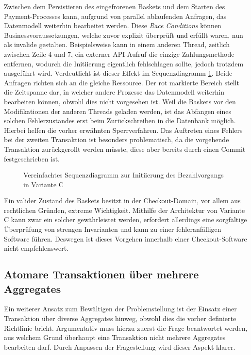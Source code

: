 Zwischen dem Persistieren des eingefrorenen Baskets und dem Starten des Payment-Processes kann, aufgrund von parallel ablaufenden Anfragen, das Datenmodell weiterhin bearbeitet werden. Diese \emph{\Gls{Race Condition}s} können Businessvoraussetzungen, welche zuvor explizit überprüft und erfüllt waren, nun als invalide gestalten. Beispielsweise kann in einem anderen Thread, zeitlich zwischen Zeile 4 und 7, ein externer API-Aufruf die einzige Zahlungsmethode entfernen, wodurch die Initiierung eigentlich fehlschlagen sollte, jedoch trotzdem ausgeführt wird. Verdeutlicht ist dieser Effekt im Sequenzdiagramm \ref{fig:VarC-Sequence-Alt}. Beide Anfragen richten sich an die gleiche Ressource. Der rot markierte Bereich stellt die Zeitspanne dar, in welcher andere Prozesse das Datenmodell weiterhin bearbeiten können, obwohl dies nicht vorgesehen ist. Weil die Baskets vor den Modifikationen der anderen Threads geladen werden, ist das Abfangen eines solchen Fehlerzustandes erst beim Zurückschreiben in die Datenbank möglich. Hierbei helfen die vorher erwähnten Sperrverfahren. Das Auftreten eines Fehlers bei der zweiten Transaktion ist besonders problematisch, da die vorgehende Transaktion zurückgerollt werden müsste, diese aber bereits durch einen Commit festgeschrieben ist. 

\begin{figure}[H]
	\vspace{0.5cm}
	\centering
	
	\caption{Vereinfachtes Sequenzdiagramm zur Initiierung des Bezahlvorgangs in Variante C}
	\label{fig:VarC-Sequence-Alt}
\end{figure}

Ein valider Zustand des Baskets besitzt in der Checkout-Domain, vor allem aus rechtlichen Gründen, extreme Wichtigkeit. Mithilfe der Architektur von Variante C kann zwar ein solcher gewährleistet werden, erfordert allerdings eine sorgfältige Überprüfung von strengen Invarianten und kann zu einer fehleranfälligen Software führen. Deswegen ist dieses Vorgehen innerhalb einer Checkout-Software nicht empfehlenswert. 


\subsection{Atomare Transaktionen über mehrere Aggregates}

Ein weiterer Ansatz zum Bewältigen der Problemstellung ist der Einsatz einer Transaktion über diverse Aggregates hinweg, obwohl dies die vorher definierte Richtlinie bricht. Argumentativ muss hierzu zuerst die Frage beantwortet werden, aus welchem Grund überhaupt eine Transaktion nicht mehrere Aggregates bearbeiten darf. Durch Anpassen der Fragestellung wird dieser Aspekt klarer. 

